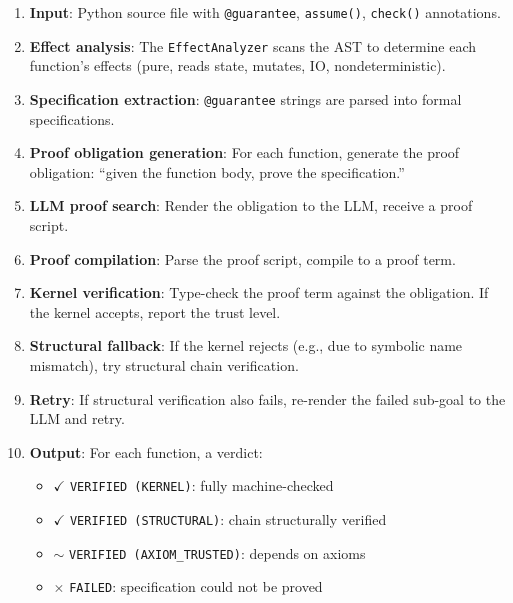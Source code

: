\documentclass[11pt,a4paper]{report}
\theoremstyle{definition}
\theoremstyle{plain}
\begin{document}
\begin{enumerate}
  \item \textbf{Input}: Python source file with \lstinline[style=synhopy]{@guarantee},
    \lstinline[style=synhopy]{assume()}, \lstinline[style=synhopy]{check()} annotations.

  \item \textbf{Effect analysis}: The \lstinline[style=python]{EffectAnalyzer} scans the
    AST to determine each function's effects (pure, reads state, mutates, IO,
    nondeterministic).

  \item \textbf{Specification extraction}: \lstinline[style=synhopy]{@guarantee} strings
    are parsed into formal specifications.

  \item \textbf{Proof obligation generation}: For each function, generate the
    proof obligation: ``given the function body, prove the specification.''

  \item \textbf{LLM proof search}: Render the obligation to the LLM, receive a
    proof script.

  \item \textbf{Proof compilation}: Parse the proof script, compile to a proof term.

  \item \textbf{Kernel verification}: Type-check the proof term against the
    obligation. If the kernel accepts, report the trust level.

  \item \textbf{Structural fallback}: If the kernel rejects (e.g., due to symbolic
    name mismatch), try structural chain verification.

  \item \textbf{Retry}: If structural verification also fails, re-render the
    failed sub-goal to the LLM and retry.

  \item \textbf{Output}: For each function, a verdict:
    \begin{itemize}
      \item $\checkmark$ \texttt{VERIFIED (KERNEL)}: fully machine-checked
      \item $\checkmark$ \texttt{VERIFIED (STRUCTURAL)}: chain structurally verified
      \item $\sim$ \texttt{VERIFIED (AXIOM\_TRUSTED)}: depends on axioms
      \item $\times$ \texttt{FAILED}: specification could not be proved
    \end{itemize}
\end{enumerate}
\end{document}
